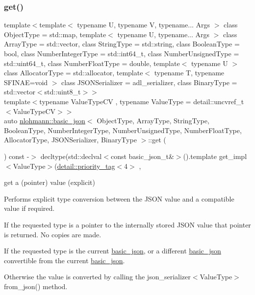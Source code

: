 \subsubsection{\texorpdfstring{get()}{get()}\hspace{0.1cm}{\footnotesize\ttfamily [1/2]}}
{\footnotesize\ttfamily template$<$template$<$ typename U, typename V, typename... Args $>$ class Object\+Type = std\+::map, template$<$ typename U, typename... Args $>$ class Array\+Type = std\+::vector, class String\+Type  = std\+::string, class Boolean\+Type  = bool, class Number\+Integer\+Type  = std\+::int64\+\_\+t, class Number\+Unsigned\+Type  = std\+::uint64\+\_\+t, class Number\+Float\+Type  = double, template$<$ typename U $>$ class Allocator\+Type = std\+::allocator, template$<$ typename T, typename S\+F\+I\+N\+A\+E=void $>$ class J\+S\+O\+N\+Serializer = adl\+\_\+serializer, class Binary\+Type  = std\+::vector$<$std\+::uint8\+\_\+t$>$$>$ \\
template$<$typename Value\+Type\+CV , typename Value\+Type  = detail\+::uncvref\+\_\+t$<$\+Value\+Type\+C\+V$>$$>$ \\
auto \hyperlink{classnlohmann_1_1basic__json}{nlohmann\+::basic\+\_\+json}$<$ Object\+Type, Array\+Type, String\+Type, Boolean\+Type, Number\+Integer\+Type, Number\+Unsigned\+Type, Number\+Float\+Type, Allocator\+Type, J\+S\+O\+N\+Serializer, Binary\+Type $>$\+::get (\begin{DoxyParamCaption}{ }\end{DoxyParamCaption}) const -\/$>$ decltype(std\+::declval$<$const basic\+\_\+json\+\_\+t\&$>$().template get\+\_\+impl$<$Value\+Type$>$(\hyperlink{structnlohmann_1_1detail_1_1priority__tag}{detail\+::priority\+\_\+tag}$<$4$>$ \hspace{0.3cm}{\ttfamily [inline]}, {\ttfamily [noexcept]}}



get a (pointer) value (explicit) 

Performs explicit type conversion between the J\+S\+ON value and a compatible value if required.


\begin{DoxyItemize}
\item If the requested type is a pointer to the internally stored J\+S\+ON value that pointer is returned. No copies are made.
\item If the requested type is the current \hyperlink{classnlohmann_1_1basic__json}{basic\+\_\+json}, or a different \hyperlink{classnlohmann_1_1basic__json}{basic\+\_\+json} convertible from the current \hyperlink{classnlohmann_1_1basic__json}{basic\+\_\+json}.
\item Otherwise the value is converted by calling the json\+\_\+serializer$<$\+Value\+Type$>$ {\ttfamily from\+\_\+json()} method.
\end{DoxyItemize}


